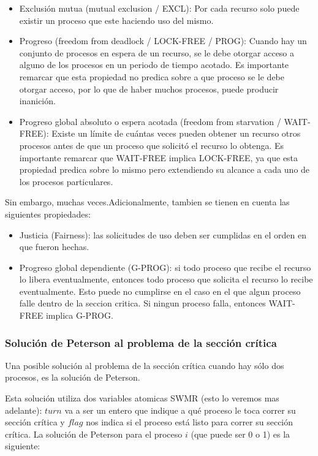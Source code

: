 \documentclass{article}
\begin{document}
\begin{itemize}
\item Exclusión mutua (mutual exclusion / EXCL): Por cada recurso solo puede existir un proceso que este haciendo uso del mismo.
\item Progreso (freedom from deadlock / LOCK-FREE / PROG): Cuando hay un conjunto de procesos en espera de un recurso, se le debe otorgar acceso a alguno de los procesos en un periodo de tiempo acotado. Es importante remarcar que esta propiedad no predica sobre a que proceso se le debe otorgar acceso, por lo que de haber muchos procesos, puede producir inanición.
\item Progreso global absoluto o espera acotada (freedom from starvation / WAIT-FREE): Existe un l\'imite de cu\'antas veces pueden obtener un recurso otros procesos antes de que un proceso que solicitó el recurso lo obtenga. Es importante remarcar que WAIT-FREE implica LOCK-FREE, ya que esta propiedad predica sobre lo mismo pero extendiendo su alcance a cada uno de los procesos particulares.
\end{itemize}



Sin embargo, muchas veces.Adicionalmente, tambien se tienen en cuenta las siguientes propiedades:
\begin{itemize}
 \item Justicia (Fairness): las solicitudes de uso deben ser cumplidas en el orden en que fueron hechas.
 \item Progreso global dependiente (G-PROG): si todo proceso que recibe el recurso lo libera eventualmente, entonces todo proceso que solicita el recurso lo recibe eventualmente. Esto puede no cumplirse en el caso en el que algun proceso falle dentro de la seccion critica. Si ningun proceso falla, entonces WAIT-FREE implica G-PROG.
\end{itemize}


\subsubsection{Soluci\'on de Peterson al problema de la secci\'on cr\'itica}

Una posible soluci\'on al problema de la secci\'on cr\'itica cuando hay s\'olo dos procesos, es la soluci\'on de Peterson.

Esta soluci\'on utiliza dos variables atomicas SWMR (esto lo veremos mas adelante): $turn$ va a ser un entero que indique a qu\'e proceso le toca correr su secci\'on cr\'itica y $flag$ nos indica si el proceso está listo para correr su secci\'on cr\'itica. La soluci\'on de Peterson para el proceso $i$ (que puede ser 0 o 1) es la siguiente:
\end{document}
